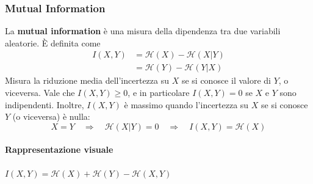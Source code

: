 \subsubsection{Mutual Information}
La \textbf{mutual information} è una misura della dipendenza tra due variabili aleatorie. È definita come
\begin{align*}
    I(X,Y) &= \mathcal{H}(X) - \mathcal{H}(X|Y)\\
    &= \mathcal{H}(Y) - \mathcal{H}(Y|X)
\end{align*}
Misura la riduzione media dell'incertezza su $X$ se si conosce il valore di $Y$, o viceversa. 
Vale che $I(X,Y)\geq0$, e in particolare $I(X,Y)=0$ se $X$ e $Y$ sono indipendenti. 
Inoltre, $I(X,Y)$ è massimo quando l'incertezza su $X$ se si conosce $Y$ (o viceversa) è nulla:
$$
    X=Y \quad \Rightarrow \quad \mathcal{H}(X|Y)=0 \quad \Rightarrow \quad I(X,Y) = \mathcal{H}(X)
$$

\paragraph{Rappresentazione visuale} $I(X,Y) = \mathcal{H}(X) + \mathcal{H}(Y) - \mathcal{H}(X,Y)$
\begin{center}
\end{center}

